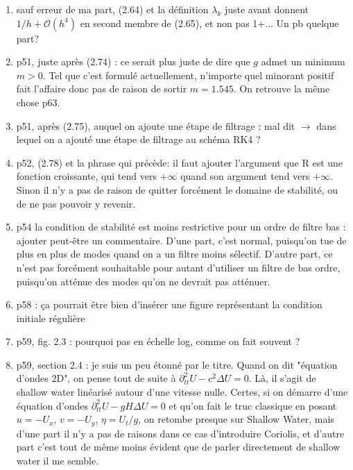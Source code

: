 \documentclass[10pt,a4paper]{article}
\begin{document}
\begin{enumerate}
\item sauf erreur de ma part, (2.64) et la définition $\lambda_k$ juste avant donnent $1/h + \mathcal{O}(h^4)$ en second membre de (2.65), et non pas 1+... Un pb quelque part?


\item p51, juste après (2.74) : ce serait plus juste de dire que $g$ admet un minimum $m>0$. Tel que c'est formulé actuellement, n'importe quel minorant positif fait l'affaire donc pas de raison de sortir $m=1.545$. On retrouve la même chose p63.


\item p51, après (2.75), auquel on ajoute une étape de filtrage : mal dit $\rightarrow$ dans lequel on a ajouté une étape de filtrage au schéma RK4 ?


\item p52, (2.78) et la phrase qui précède: il faut ajouter l’argument que R est une fonction
croissante, qui tend vers $+\infty$ quand son argument tend vers $+\infty$. Sinon il n’y a pas
de raison de quitter forcément le domaine de stabilité, ou de ne pas pouvoir y revenir.


\item p54 la condition de stabilité est moins restrictive pour un ordre de filtre bas : ajouter
peut-être un commentaire. D’une part, c’est normal, puisqu’on tue de plus en plus
de modes quand on a un filtre moins sélectif. D’autre part, ce n’est pas forcément
souhaitable pour autant d’utiliser un filtre de bas ordre, puisqu’on atténue des modes
qu’on ne devrait pas atténuer.


\item p58 : ça pourrait être bien d’insérer une figure représentant la condition initiale
régulière


\item p59, fig. 2.3 : pourquoi pas en échelle log, comme on fait souvent ?



\item p59, section 2.4 : je suis un peu étonné par le titre. Quand on dit "équation d'ondes 2D", on pense tout de suite à $\partial^2_{tt}U-c^2 \Delta U =0$. Là, il s'agit de shallow water linéarisé autour d'une vitesse nulle. Certes, si on démarre d'une équation d'ondes $\partial^2_{tt}U-gH \Delta U =0$ et qu'on fait le truc classique en posant $u=-U_x$, $v=-U_y$, $\eta = U_t/g$, on retombe presque sur Shallow Water, mais d'une part il n'y a pas de raisons dans ce cas d'introduire Coriolis, et d'autre part c'est tout de même moins évident que de parler directement de shallow water il me semble.



\end{enumerate}
\end{document}
